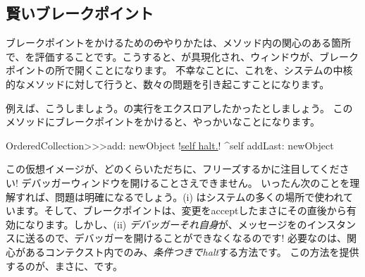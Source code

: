\documentclass[a4paper,10pt,twoside]{book}
\begin{document}
\subsection{賢いブレークポイント}

ブレークポイントをかけるための\st のやりかたは、メソッド内の関心のある箇所で、を評価することです。こうすると、が具現化され、ウィンドウが、ブレークポイントの所で開くことになります。
不幸なことに、これを、システムの中核的なメソッドに対して行うと、数々の問題を引き起こすことになります。

例えば、こうしましょう。の実行をエクスロアしたかったとしましょう。
このメソッドにブレークポイントをかけると、やっかいなことになります。

\begin{code}{}
OrderedCollection>>>add: newObject
	!\underline{self halt.}!
	^self addLast: newObject
\end{code}

この仮想イメージが、どのくらいただちに、フリーズするかに注目してください! デバッガーウィンドウを開けることさえできません。
いったん次のことを理解すれば、問題は明確になるでしょう。(i) はシステムの多くの場所で使われています。そして、ブレークポイントは、変更をacceptしたまさにその直後から有効になります。しかし、(ii) \emph{デバッガーそれ自身}が、メッセージをのインスタンスに送るので、デバッガーを開けることができなくなるのです!
必要なのは、関心があるコンテクスト内でのみ、\emph{条件つきでhalt}する方法です。
この方法を提供するのが、まさに、です。
\end{document}
